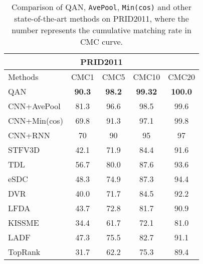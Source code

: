 \documentclass[10pt,twocolumn,letterpaper]{article}
\begin{document}
\begin{table}[!htb]
\normalsize
\centering
  \begin{tabular}{l|c|c|c|c}
\hline
      \multicolumn{5}{c}{PRID2011}\\
\hline
       Methods & CMC1 &CMC5&CMC10 & CMC20 \\
\hline
       QAN 	& \textbf{90.3} & \textbf{98.2} & \textbf{99.32} & \textbf{100.0}  \\
       CNN+AvePool 		& 81.3 & 96.6 & 98.5 & 99.6 \\
       CNN+Min(cos) 		& 69.8 & 91.3 & 97.1 & 99.8  \\
\hline
       CNN+RNN\cite{wu2016deep} & 70 & 90 & 95 & 97  \\
       STFV3D\cite{liu2015spatio} & 42.1 & 71.9 & 84.4 & 91.6 \\
       TDL\cite{you2016top} 				& 56.7 & 80.0 & 87.6 & 93.6 \\
       eSDC\cite{wang2016person} 	& 48.3 & 74.9 & 87.3 & 94.4  \\
       DVR\cite{wang2016person} 	& 40.0 & 71.7 & 84.5 & 92.2 \\
       LFDA\cite{pedagadi2013local}	& 43.7 & 72.8 & 81.7 & 90.9  \\
       KISSME\cite{koestinger2012large}	& 34.4 & 61.7 & 72.1 & 81.0  \\
       LADF\cite{li2013learning} 				& 47.3 & 75.5 & 82.7 & 91.1 \\
       TopRank\cite{li2014top} 			& 31.7 & 62.2 & 75.3 & 89.4  \\
\hline
  \end{tabular}
  \caption{Comparison of QAN, \texttt{AvePool}, \texttt{Min(cos)} and other state-of-the-art methods on PRID2011, where the number represents the cumulative matching rate in CMC curve.}
\label{tab1}
\end{table}
\end{document}
